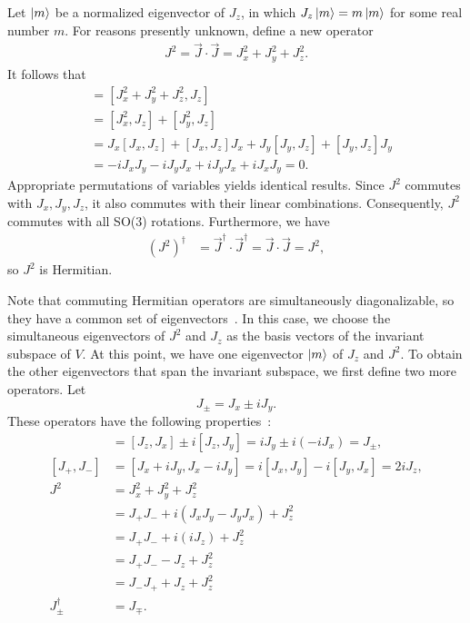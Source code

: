 Let $\ket{m}$ be a normalized eigenvector of $J_z$, in which $J_z\ket{m} = m\ket{m}$ for some real number $m$. For reasons presently unknown, define a new operator
\begin{align*}
    J^2 = \vec{J}\cdot\vec{J} = J_x^2 + J_y^2 + J_z^2.
\end{align*}
It follows that
\begin{align*}
    [J^2,J_z] 
        &= [J_x^2 + J_y^2 + J_z^2, J_z] \\
        &= [J_x^2,J_z] + [J_y^2,J_z] \\
        &= J_x [J_x,J_z] + [J_x,J_z]J_x + J_y [J_y,J_z] + [J_y,J_z]J_y \\
        &= -i J_x J_y -i J_y J_x + i J_y J_x + i J_x J_y = 0.
\end{align*}
Appropriate permutations of variables yields identical results. Since $J^2$ commutes with $J_x,J_y,J_z$, it also commutes with their linear combinations. Consequently, $J^2$ commutes with all SO(3) rotations. Furthermore, we have
\begin{align*}
    {(J^2)}^\dagger &= \vec{J}^\dagger\cdot\vec{J}^\dagger = \vec{J}\cdot\vec{J} = J^2,
\end{align*}
so $J^2$ is Hermitian.

Note that commuting Hermitian operators are simultaneously diagonalizable, so they have a common set of eigenvectors~\cite{Zwiebach2022}. In this case, we choose the simultaneous eigenvectors of $J^2$ and $J_z$ as the basis vectors of the invariant subspace of $V$. At this point, we have one eigenvector $\ket{m}$ of $J_z$ and $J^2$. To obtain the other eigenvectors that span the invariant subspace, we first define two more operators. Let
\begin{equation}
    J_\pm = J_x \pm i J_y.
\end{equation}
These operators have the following properties~\cite{Tung1985,Griffiths2018,Hall2013}:
\begin{align*}
    [J_z, J_\pm] &= [J_z, J_x] \pm i[J_z, J_y] = i J_y \pm i(-i J_x) = J_\pm, \\
    [J_+, J_-] &= [J_x + i J_y, J_x - i J_y] = i[J_x, J_y] - i[J_y, J_x] = 2i J_z, \\
    J^2 
        &=  J_x^2 + J_y^2 + J_z^2 \\
        &=  J_+ J_- + i(J_x J_y - J_y J_x) + J_z^2 \\
        &=  J_+ J_- + i(i J_z) + J_z^2 \\
        &= J_+ J_- - J_z + J_z^2 \\
        &= J_- J_+ + J_z + J_z^2 \\
    J_\pm^\dagger &= J_\mp.
\end{align*}

